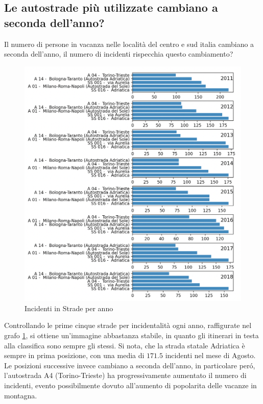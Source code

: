 \documentclass[a4paper]{report}
\begin{document}
\subsection{Le autostrade più utilizzate cambiano a seconda dell'anno?}

Il numero di persone in vacanza nelle località del centro e sud italia cambiano 
a seconda dell'anno, il numero di incidenti rispecchia questo cambiamento?

\begin{figure}
    \includegraphics[width=\linewidth]{../src/incidenti/incidenti_aci/agosto/autostrade.png}
    \caption{Incidenti in Strade per anno}
    \label{fig:autostrade-anno}
\end{figure}

Controllando le prime cinque strade per incidentalità ogni anno, 
raffigurate nel grafo \ref{fig:autostrade-anno}, si ottiene un'immagine 
abbastanza stabile, in quanto gli itinerari in testa alla classifica sono sempre gli stessi.
Si nota, che la strada statale Adriatica è sempre in prima posizione, 
con una media di $171.5$ incidenti nel mese di Agosto.
Le posizioni successive invece cambiano a seconda dell'anno, in particolare per\'o, l'autostrada 
A4 (Torino-Trieste) ha progressivamente aumentato il numero di incidenti, evento possibilmente 
dovuto all'aumento di popolarita delle vacanze in montagna.
\end{document}
